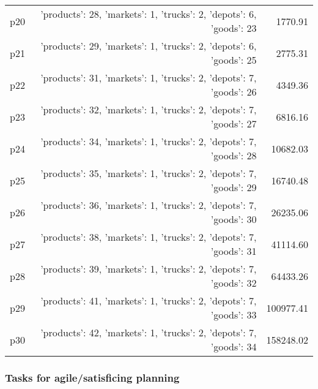 \documentclass{article}
\begin{document}
\begin{center}
\begin{tabular}{@{}l|r|r@{}}
  p20&{'products': 28, 'markets': 1, 'trucks': 2, 'depots': 6, 'goods': 23}&1770.91\\
  p21&{'products': 29, 'markets': 1, 'trucks': 2, 'depots': 6, 'goods': 25}&2775.31\\
  p22&{'products': 31, 'markets': 1, 'trucks': 2, 'depots': 7, 'goods': 26}&4349.36\\
  p23&{'products': 32, 'markets': 1, 'trucks': 2, 'depots': 7, 'goods': 27}&6816.16\\
  p24&{'products': 34, 'markets': 1, 'trucks': 2, 'depots': 7, 'goods': 28}&10682.03\\
  p25&{'products': 35, 'markets': 1, 'trucks': 2, 'depots': 7, 'goods': 29}&16740.48\\
  p26&{'products': 36, 'markets': 1, 'trucks': 2, 'depots': 7, 'goods': 30}&26235.06\\
  p27&{'products': 38, 'markets': 1, 'trucks': 2, 'depots': 7, 'goods': 31}&41114.60\\
  p28&{'products': 39, 'markets': 1, 'trucks': 2, 'depots': 7, 'goods': 32}&64433.26\\
  p29&{'products': 41, 'markets': 1, 'trucks': 2, 'depots': 7, 'goods': 33}&100977.41\\
  p30&{'products': 42, 'markets': 1, 'trucks': 2, 'depots': 7, 'goods': 34}&158248.02
                            \end{tabular}
                            \end{center}
                    

                                \subsubsection*{Tasks for agile/satisficing planning}
                                
\end{document}
